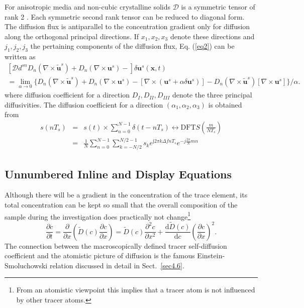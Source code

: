 \documentclass[cmbright]{WileySTAT-V1} %
\theoremstyle{plain}
\begin{document}
For anisotropic media and non-cubic crystalline solids $\mathcal{D}$
is a symmetric tensor of rank 2 \cite{R2}. Each symmetric
second rank tensor can be reduced to diagonal form. The diffusion
flux is antiparallel to the concentration gradient only for
diffusion along the orthogonal principal directions. If $x_{1},
x_{2}, x_{3}$ denote these directions and $j_{1}, j_{2}, j_{3}$ the
pertaining components of the diffusion flux, Eq. (\ref{eq2}) can
be written as\begin{multline}\label{eq3}
\left[\mathcal{D} d^{sn} D_{n} \left(\nabla\times\tilde{\mathbf{u}}^{s}\right) +
D_{n}\left(\nabla\times{\mathbf{u}}^{s}\right)-\right]\delta\mathbf{u}^{s}(\mathbf{x},t) \\
= \lim_{\alpha\to0}\big\{ D_{n}\left(\nabla\times\tilde{\mathbf{u}}^{s}\right) +
D_{n}\left(\nabla\times{\mathbf{u}}^{s}\right)-
\left[\nabla\times\left(\mathbf{u}^{s}+\alpha\delta\mathbf{u}^{s}\right)\right]
-D_{n}\left(\nabla\times\tilde{\mathbf{u}}^{s}\right)\left[\nabla\times\mathbf{u}^{s}\right]\big\}/\alpha.
\end{multline}
where diffusion coefficient for a direction $D_{I}, D_{II}, D_{III}$ denote the three principal diffusivities. The diffusion coefficient for a direction $(\alpha_{1}, \alpha_{2}, \alpha_{3})$ is obtained from
\begin{eqnarray}
s(nT_{s}) &= &s(t)\times \sum\limits_{n=0}^{N-1} \delta (t-nT_{s}) \leftrightarrow{\mathrm{DFT}} S \left(\frac{m}{NT_{s}}\right) \nonumber\\
&= &\frac{1}{N} \sum\limits_{n=0}^{N-1} \sum\limits_{k=-N/2}^{N/2-1} s_{k} e^{\mathrm{j}2\pi k\Delta fnT_{s}} e^{-j\frac{2\pi}{N}mn}
\end{eqnarray}

\subsection{Unnumbered Inline and Display Equations}\label{sec4.5}
Although there will be a gradient in the concentration of the trace element, its total concentration can be kept so small that the overall composition of the sample during the investigation does practically not change\footnote{From an atomistic viewpoint this implies that a tracer atom is not influenced by other tracer atoms.}
$$
\frac{\partial c}{\partial t}=\frac{\partial}{\partial
x}\left(\tilde{D}(c)\frac{\partial c}{\partial
x}\right)=\tilde{D}(c)\frac{\partial^{2}c}{\partial
x^{2}}+\frac{\mathrm{d}\tilde{D}(c)}{\mathrm{d}c}\left(\frac{\partial
c}{\partial x}\right)^{2}.
$$
The connection between the macroscopically defined tracer self-diffusion coefficient and the atomistic picture of diffusion is the famous Einstein-Smoluchowski relation discussed in detail in Sect.~\ref{sec4.6}.
\end{document}
